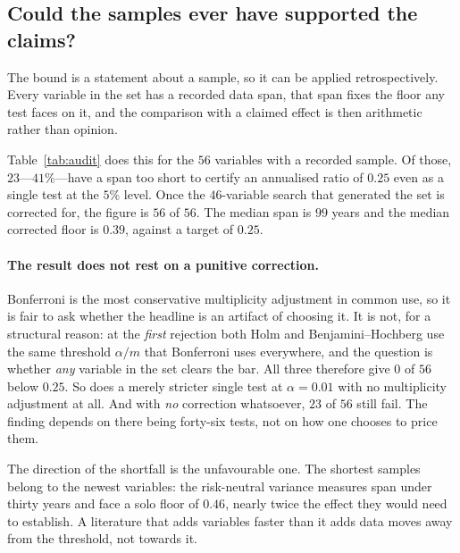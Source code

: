 \documentclass{article}
\theoremstyle{plain}
\theoremstyle{definition}
\begin{document}
\subsection{Could the samples ever have supported the claims?}
\label{sec:audit}

The bound is a statement about a sample, so it can be applied retrospectively. Every variable
in the set has a recorded data span, that span fixes the floor any test faces on it, and the
comparison with a claimed effect is then arithmetic rather than opinion.

Table~\ref{tab:audit} does this for the $56$ variables with a recorded sample. Of those,
$23$---$41\%$---have a span too short to certify an annualised ratio of $0.25$ even as a single
test at the $5\%$ level. Once the $46$-variable search that generated the set is corrected for,
the figure is $56$ of $56$. The median span is $99$ years and the median corrected floor is
$0.39$, against a target of $0.25$.

\paragraph{The result does not rest on a punitive correction.} Bonferroni is the most
conservative multiplicity adjustment in common use, so it is fair to ask whether the headline
is an artifact of choosing it. It is not, for a structural reason: at the \emph{first}
rejection both Holm and Benjamini--Hochberg use the same threshold $\alpha/m$ that Bonferroni
uses everywhere, and the question is whether \emph{any} variable in the set clears the bar. All three therefore give $0$ of $56$ below $0.25$. So does a merely stricter single
test at $\alpha=0.01$ with no multiplicity adjustment at all. And with \emph{no} correction
whatsoever, $23$ of $56$ still fail. The finding depends on there being forty-six tests, not
on how one chooses to price them.

The direction of the shortfall is the unfavourable one. The shortest samples belong to the
newest variables: the risk-neutral variance measures span under thirty years and face a solo
floor of $0.46$, nearly twice the effect they would need to establish. A literature that adds
variables faster than it adds data moves away from the threshold, not towards it.
\end{document}
